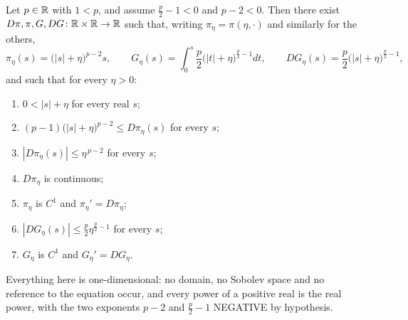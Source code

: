 \begin{helper}
Let $p\in\mathbb{R}$ with $1<p$, and assume $\tfrac p2-1<0$ and $p-2<0$.  Then there
exist $D\pi,\pi,G,DG\colon\mathbb{R}\times\mathbb{R}\to\mathbb{R}$ such that, writing
$\pi_\eta=\pi(\eta,\cdot)$ and similarly for the others,
\[
\pi_\eta(s)=\bigl(|s|+\eta\bigr)^{p-2}s,\qquad
G_\eta(s)=\int_0^s\frac p2\bigl(|t|+\eta\bigr)^{\frac p2-1}dt,\qquad
DG_\eta(s)=\frac p2\bigl(|s|+\eta\bigr)^{\frac p2-1},
\]
and such that for every $\eta>0$:
\begin{enumerate}
\item[(i)] $0<|s|+\eta$ for every real $s$;
\item[(ii)] $(p-1)\bigl(|s|+\eta\bigr)^{p-2}\le D\pi_\eta(s)$ for every $s$;
\item[(iii)] $|D\pi_\eta(s)|\le\eta^{\,p-2}$ for every $s$;
\item[(iv)] $D\pi_\eta$ is continuous;
\item[(v)] $\pi_\eta$ is $C^1$ and $\pi_\eta'=D\pi_\eta$;
\item[(vi)] $|DG_\eta(s)|\le\tfrac p2\eta^{\frac p2-1}$ for every $s$;
\item[(vii)] $G_\eta$ is $C^1$ and $G_\eta'=DG_\eta$.
\end{enumerate}
Everything here is one-dimensional: no domain, no Sobolev space and no
reference to the equation occur, and every power of a positive real is the real
power, with the two exponents $p-2$ and $\tfrac p2-1$ NEGATIVE by hypothesis.
\end{helper}
